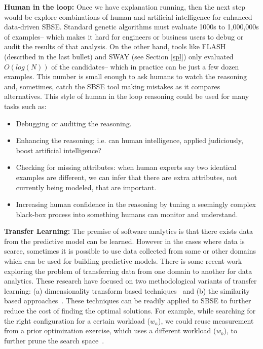 \documentclass[sigconf,anonymous,review]{acmart}
\begin{document}
 \noindent\textbf{Human in the loop: } Once we have explanation running, then the next step would be explore
combinations of human and artificial intelligence for
enhanced data-driven SBSE.
Standard
genetic algorithms must evaluate 1000s to 1,000,000s of examples-- which makes it hard for engineers or business users to debug or audit the results of that analysis. On the 
other hand, tools like FLASH (described in the last bullet)
and SWAY (see Section \ref{spl}) only evaluated $O(log(N))$ of the candidates-- which in practice can be just a few dozen examples. This number is small enough to ask humans
to watch the reasoning and, sometimes, catch the SBSE
tool making mistakes as it compares alternatives.  This style of human in the loop reasoning could be used for many tasks such as:
\begin{itemize}[leftmargin=*]
\item Debugging or auditing the reasoning.
\item Enhancing the reasoning; i.e. can human intelligence, applied judiciously,  boost artificial intelligence?
\item Checking for missing attributes: when human experts say two identical examples are different, we can infer that there are extra attributes, not currently being modeled, that are important.
\item Increasing human  confidence in the reasoning by tuning a seemingly complex black-box process into something
humans can monitor and understand.
\end{itemize}


 \noindent\textbf{Transfer Learning: }The premise of software analytics is that there exists data
from the predictive model can be learned. However in the cases where data is scarce, sometimes it is possible to use data collected from same or other domains
which can be used for building predictive models. There is some recent work exploring the problem of transferring data from one domain to another for data analytics. These research have focused on two methodological variants of transfer learning: (a) dimensionality
transform based techniques~\cite{nam2013transfer, krishna2016too, nam2017heterogeneous,minku2014transfer}
and (b) the similarity based approaches~\cite{kocaguneli2011find, kocaguneli2015transfer, peters2015lace2}.
These techniques can be readily applied to SBSE to further reduce the cost of finding the optimal solutions. For example, while searching for the right configuration for a certain workload ($w_a$), we could reuse measurement from a prior optimization exercise, which uses a different workload ($w_b$), to further prune the search space~\cite{jamshidi2017transfer, jamshidi2017transfer, valov2017transferring}.
\end{document}

